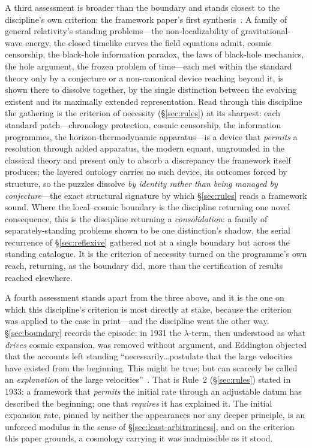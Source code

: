 \documentclass[11pt,a4paper]{article}
\begin{document}
A third assessment is broader than the boundary and stands closest to the discipline's own criterion: the framework paper's first synthesis~\cite{JanzenCRframework}. A family of general relativity's standing problems---the non-localizability of gravitational-wave energy, the closed timelike curves the field equations admit, cosmic censorship, the black-hole information paradox, the laws of black-hole mechanics, the hole argument, the frozen problem of time---each met within the standard theory only by a conjecture or a non-canonical device reaching beyond it, is shown there to dissolve together, by the single distinction between the evolving existent and its maximally extended representation. Read through this discipline the gathering is the criterion of necessity (\S\ref{sec:rules}) at its sharpest: each standard patch---chronology protection, cosmic censorship, the information programmes, the horizon-thermodynamic apparatus---is a device that \emph{permits} a resolution through added apparatus, the modern equant, ungrounded in the classical theory and present only to absorb a discrepancy the framework itself produces; the layered ontology carries no such device, its outcomes forced by structure, so the puzzles dissolve \emph{by identity rather than being managed by conjecture}---the exact structural signature by which \S\ref{sec:rules} reads a framework sound. Where the local--cosmic boundary is the discipline returning one novel consequence, this is the discipline returning a \emph{consolidation}: a family of separately-standing problems shown to be one distinction's shadow, the serial recurrence of \S\ref{sec:reflexive} gathered not at a single boundary but across the standing catalogue. It is the criterion of necessity turned on the programme's own reach, returning, as the boundary did, more than the certification of results reached elsewhere.

A fourth assessment stands apart from the three above, and it is the one on which this discipline's criterion
is most directly at stake, because the criterion was applied to the case in print---and the discipline went the
other way. \S\ref{sec:boundary} records the episode: in 1931 the $\lambda$-term, then understood as what
\emph{drives} cosmic expansion, was removed without argument, and Eddington objected that the accounts left
standing ``necessarily\ldots postulate that the large velocities have existed from the beginning. This might be
true; but can scarcely be called an \emph{explanation} of the large velocities''~\cite{Eddington1933}. That is
Rule~2 (\S\ref{sec:rules}) stated in 1933: a framework that \emph{permits} the initial rate through an
adjustable datum has described the beginning; one that \emph{requires} it has explained it. The initial
expansion rate, pinned by neither the appearances nor any deeper principle, is an unforced modulus in the sense
of \S\ref{sec:least-arbitrariness}, and on the criterion this paper grounds, a cosmology carrying it was
inadmissible as it stood.
\end{document}
